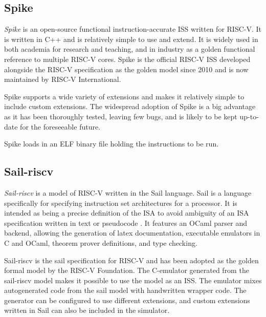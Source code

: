 \subsection{Spike}
\label{sec:spike}

\textit{Spike} is an open-source functional instruction-accurate ISS written for RISC-V. It is written in C++ and is relatively simple to use and extend. It is widely used in both academia for research and teaching, and in industry as a golden functional reference to multiple RISC-V cores. Spike is the official RISC-V ISS developed alongside the RISC-V specification as the golden model since 2010 and is now maintained by RISC-V International. \cite{SpikeRISCVISA2023}

Spike supports a wide variety of extensions and makes it relatively simple to include custom extensions.
The widespread adoption of Spike is a big advantage as it has been thoroughly tested, leaving few bugs, and is likely to be kept up-to-date for the foreseeable future. 

Spike loads in an ELF binary file holding the instructions to be run.

\subsection{Sail-riscv}
\label{sec:sail}

\textit{Sail-riscv} is a model of RISC-V written in the Sail language. Sail is a language specifically for specifying instruction set architectures for a processor. It is intended as being a precise definition of the ISA to avoid ambiguity of an ISA specification written in text or pseudocode \cite{armstrongSailInstructionsetSemantics2023}. It features an OCaml parser and backend, allowing the generation of latex documentation, executable emulators in C and OCaml, theorem prover definitions, and type checking. 

Sail-riscv is the sail specification for RISC-V and has been adopted as the golden formal model by the RISC-V Foundation\cite{RISCVSailModel2023}. 
The C-emulator generated from the sail-riscv model makes it possible to use the model as an ISS. The emulator mixes autogenerated code from the sail model with handwritten wrapper code. The generator can be configured to use different extensions, and custom extensions written in Sail can also be included in the simulator. 

